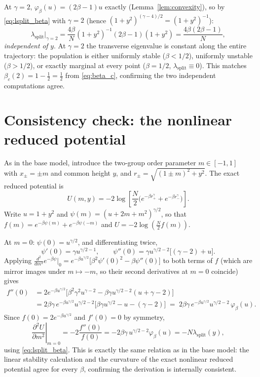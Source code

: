 \documentclass[11pt,a4paper]{article}
\theoremstyle{plain}
\theoremstyle{definition}
\theoremstyle{remark}
\newcommand{\lsplit}{\lambda_{\mathrm{split}}}
\newcommand{\bw}{\beta}
\newcommand{\phib}{\varphi_{\bw}}
\newcommand{\bwc}{\beta_c}
\begin{document}
At $\gamma=2$, $\phib(u)=(2\bw-1)u$ exactly (Lemma~\ref{lem:convexity}), so
by \eqref{eq:lsplit_beta} with $\gamma=2$ (hence $(1+y^2)^{(\gamma-4)/2}=(1+y^2)^{-1}$):
\begin{equation}
  \boxed{
  \lsplit\Big|_{\gamma=2}
  =
  \frac{4\bw}{N}(1+y^2)^{-1}(2\bw-1)(1+y^2)
  =
  \frac{4\bw(2\bw-1)}{N},
  }
  \label{eq:gamma2_exact}
\end{equation}
\emph{independent of $y$}. At $\gamma=2$ the transverse eigenvalue is
constant along the entire trajectory: the population is either uniformly
stable ($\bw<1/2$), uniformly unstable ($\bw>1/2$), or exactly marginal at
every point ($\bw=1/2$, $\lsplit\equiv0$). This matches
$\bwc(2)=1-\tfrac12=\tfrac12$ from \eqref{eq:beta_c}, confirming the two
independent computations agree.

\section{Consistency check: the nonlinear reduced potential}
\label{sec:nonlinear}

As in the base model, introduce the two-group order parameter $m\in[-1,1]$
with $x_\pm=\pm m$ and common height $y$, and
$r_\pm=\sqrt{(1\pm m)^2+y^2}$. The exact reduced potential is
\begin{equation}
  U(m,y)=-2\log\left[\frac{N}{2}\Big(e^{-\bw r_+^{\gamma}}+e^{-\bw r_-^{\gamma}}\Big)\right].
  \label{eq:Ured_beta}
\end{equation}
Write $u=1+y^2$ and $\psi(m)=(u+2m+m^2)^{\gamma/2}$, so that
$f(m)=e^{-\bw\psi(m)}+e^{-\bw\psi(-m)}$ and $U=-2\log(\tfrac{N}{2}f(m))$.

At $m=0$: $\psi(0)=u^{\gamma/2}$, and differentiating twice,
\[
  \psi'(0)=\gamma u^{\gamma/2-1},
  \qquad
  \psi''(0)=\gamma u^{\gamma/2-2}\big[(\gamma-2)+u\big].
\]
Applying $\frac{d^2}{dm^2}e^{-\bw\psi}\big|_0=e^{-\bw u^{\gamma/2}}\big[\bw^2\psi'(0)^2-\bw\psi''(0)\big]$
to both terms of $f$ (which are mirror images under $m\mapsto-m$, so their
second derivatives at $m=0$ coincide) gives
\begin{align}
  f''(0)
  &=
  2e^{-\bw u^{\gamma/2}}
  \Big[\bw^2\gamma^2 u^{\gamma-2}-\bw\gamma u^{\gamma/2-2}(u+\gamma-2)\Big]
  \nonumber\\
  &=
  2\bw\gamma\, e^{-\bw u^{\gamma/2}}u^{\gamma/2-2}
  \Big[\bw\gamma u^{\gamma/2}-u-(\gamma-2)\Big]
  \;=\;
  2\bw\gamma\, e^{-\bw u^{\gamma/2}}u^{\gamma/2-2}\,\phib(u).
  \label{eq:fpp0_beta}
\end{align}
Since $f(0)=2e^{-\bw u^{\gamma/2}}$ and $f'(0)=0$ by symmetry,
\begin{equation}
  \boxed{
  \left.\frac{\partial^2 U}{\partial m^2}\right|_{m=0}
  =
  -2\frac{f''(0)}{f(0)}
  =
  -2\bw\gamma\, u^{\gamma/2-2}\phib(u)
  =
  -N\lsplit(y),
  }
  \label{eq:consistency_check}
\end{equation}
using \eqref{eq:lsplit_beta}. This is exactly the same relation as in the
base model: the linear stability calculation and the curvature of the exact
nonlinear reduced potential agree for every $\bw$, confirming the
derivation is internally consistent.
\end{document}
